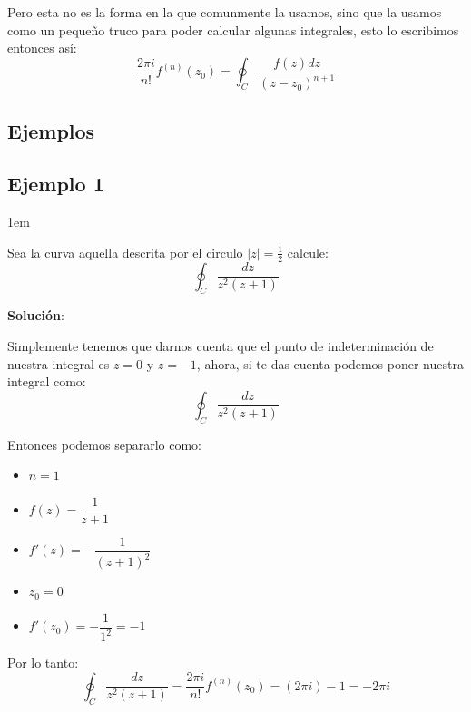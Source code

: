 \documentclass[12pt, fleqn]{report}                             %
\newenvironment{SmallIndentation}[1][0.75em]                    %
        {\begin{adjustwidth}{#1}{}\begin{footnotesize}}             %
        {\end{footnotesize}\end{adjustwidth}}                       %
\theoremstyle{break}                                            %
\begin{document}
            Pero esta no es la forma en la que comunmente la usamos, sino que la usamos
            como un pequeño truco para poder calcular algunas integrales,
            esto lo escribimos entonces así:
            \begin{equation*}
                \dfrac{2 \pi i}{n!}f^{(n)}(z_0) = \oint_C \dfrac{f(z) dz}{(z-z_0)^{n+1}}
            \end{equation*}
                
            \subsection{Ejemplos}

                \subsection*{Ejemplo 1}
                \begin{SmallIndentation}[1em]


                    Sea la curva aquella descrita por el circulo $|z|=\frac{1}{2}$
                    calcule:
                    \begin{equation*}
                        \oint_C \dfrac{dz}{z^2(z+1)}
                    \end{equation*}

                    \textbf{Solución}:

                    Simplemente tenemos que darnos cuenta que el punto de indeterminación de
                    nuestra integral es $z=0$ y $z=-1$, ahora, si te das cuenta podemos poner
                    nuestra integral como:
                    \begin{equation*}
                        \oint_C \dfrac{dz}{z^2(z+1)}
                    \end{equation*}

                    Entonces podemos separarlo como:
                    \begin{itemize}
                        \item $n=1$
                        \item $f(z) = \dfrac{1}{z+1}$
                        \item $f'(z) = -\dfrac{1}{(z+1)^2}$
                        \item $z_0 = 0$
                        \item $f'(z_0) = -\dfrac{1}{1^2} = -1$
                    \end{itemize}

                    Por lo tanto:
                    \begin{equation*}
                        \oint_C \dfrac{dz}{z^2(z+1)} 
                            = \dfrac{2 \pi i}{n!}f^{(n)}(z_0)
                            = (2 \pi i) -1
                            = -2 \pi i
                    \end{equation*}

                \end{SmallIndentation}
\end{document}
